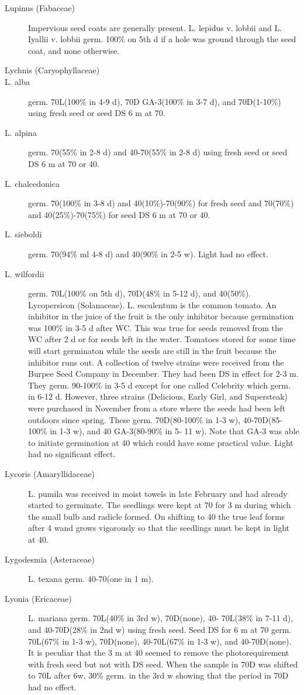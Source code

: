 \begin{description}
\item[Lupinus (Fabaceae)] Impervious seed coats are generally present. L.
lepidus v. lobbii and L. Iyallii v. lobbii germ. 100\% on 5th d if a hole was ground
through the seed coat, and none otherwise.

\item[Lychnis (Caryophyllaceae)]
\item[L. alba] germ. 70L(100\% in 4-9 d), 70D GA-3(100\% in 3-7 d), and 70D(1-10\%)
using fresh seed or seed DS 6 m at 70.
\item[L. alpina] germ. 70(55\% in 2-8 d) and 40-70(55\% in 2-8 d) using fresh seed or
seed DS 6 m at 70 or 40.
\item[L. chalcedonica] germ. 70(100\% in 3-8 d) and 40(10\%)-70(90\%) for fresh seed
and 70(70\%) and 40(25\%)-70(75\%) for seed DS 6 m at 70 or 40.
\item[L. sieboldi] germ. 70(94\% ml 4-8 d) and 40(90\% in 2-5 w). Light had no effect.
\item[L. wilfordii] germ. 70L(100\% on 5th d), 70D(48\% in 5-12 d), and 40(50\%).
Lycopersicon (Solanaceae). L. esculentum is the common tomato. An
inhibitor in the juice of the fruit is the only inhibitor because germination was 100\% in
3-5 d after WC. This was true for seeds removed from the WC after 2 d or for seeds left
in the water. Tomatoes stored for some time will start germinaton while the seeds are
still in the fruit because the inhibitor runs out. A collection of twelve strains were
received from the Burpee Seed Company in December. They had been DS in effect
for 2-3 m. They germ. 90-100\% in 3-5 d except for one called Celebrity which germ. in
6-12 d. However, three strains (Delicious, Early Girl, and Supersteak) were purchased
in November from a store where the seeds had been left outdoors since spring. These
germ. 70D(80-100\% in 1-3 w), 40-70D(85-100\% in 1-3 w), and 40 GA-3(80-90\% in 5-
11 w). Note that GA-3 was able to initiate germination at 40 which could have some
practical value. Light had no significant effect.

\item[Lycoris (Amaryllidaceae)] L. pumila was received in moist towels in late
February and had already started to germinate. The seedlings were kept at 70 for 3 m
during which the small bulb and radicle formed. On shifting to 40 the true leaf forms
after 4 wand grows vigorously so that the seedlings must be kept in light at 40.
\item[Lygodesmia (Asteraceae)] L. texana germ. 40-70(one in 1 m).
\item[Lyonia (Ericaceae)] L. mariana germ. 70L(40\% in 3rd w), 70D(none), 40-
70L(38\% in 7-11 d), and 40-70D(28\% in 2nd w) using fresh seed. Seed DS for 6 m at
70 germ. 70L(67\% in 1-3 w), 70D(none), 40-70L(67\% in 1-3 w), and 40-70D(none). It
is peculiar that the 3 m at 40 seemed to remove the photorequirement with fresh seed
but not with DS seed. When the sample in 70D was shifted to 70L after 6w, 30\%
germ. in the 3rd w showing that the period in 70D had no effect.


\end{description}
